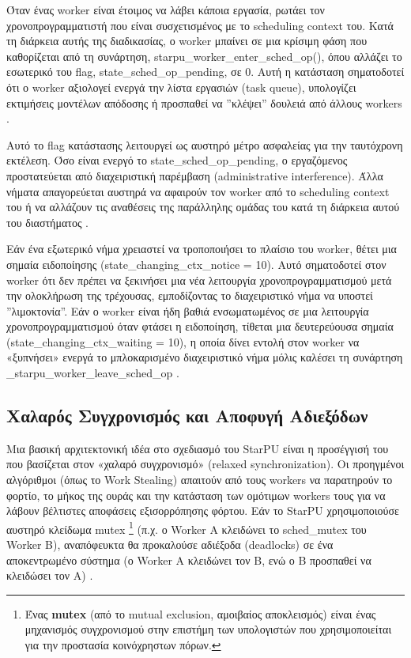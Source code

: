 Όταν ένας worker είναι έτοιμος να λάβει κάποια εργασία, ρωτάει τον χρονοπρογραμματιστή που είναι συσχετισμένος με το scheduling context του. Κατά τη διάρκεια αυτής της διαδικασίας, ο worker μπαίνει σε μια κρίσιμη φάση που καθορίζεται από τη συνάρτηση,  starpu\_worker\_enter\_sched\_op(), όπου αλλάζει το εσωτερικό του flag, state\_sched\_op\_pending, σε 0. Αυτή η κατάσταση σηματοδοτεί ότι ο worker αξιολογεί ενεργά την λίστα εργασιών (task queue), υπολογίζει εκτιμήσεις μοντέλων απόδοσης ή προσπαθεί να ''κλέψει'' δουλειά από άλλους workers \cite{starpu_dev_manual}.

Αυτό το flag κατάστασης λειτουργεί ως αυστηρό μέτρο ασφαλείας για την ταυτόχρονη εκτέλεση. Όσο είναι ενεργό το state\_sched\_op\_pending, ο εργαζόμενος προστατεύεται από διαχειριστική παρέμβαση (administrative interference). Άλλα νήματα απαγορεύεται αυστηρά να αφαιρούν τον worker από το scheduling context του ή να αλλάζουν τις αναθέσεις της παράλληλης ομάδας του κατά τη διάρκεια αυτού του διαστήματος \cite{starpu_dev_manual}.

Εάν ένα εξωτερικό νήμα χρειαστεί να τροποποιήσει το πλαίσιο του worker, θέτει μια σημαία ειδοποίησης (state\_changing\_ctx\_notice = 10). Αυτό σηματοδοτεί στον worker ότι δεν πρέπει να ξεκινήσει μια νέα λειτουργία χρονοπρογραμματισμού μετά την ολοκλήρωση της τρέχουσας, εμποδίζοντας το διαχειριστικό νήμα να υποστεί ''λιμοκτονία''. Εάν ο worker είναι ήδη βαθιά ενσωματωμένος σε μια λειτουργία χρονοπρογραμματισμού όταν φτάσει η ειδοποίηση, τίθεται μια δευτερεύουσα σημαία (state\_changing\_ctx\_waiting = 10), η οποία δίνει εντολή στον worker να «ξυπνήσει» ενεργά το μπλοκαρισμένο διαχειριστικό νήμα μόλις καλέσει τη συνάρτηση \_starpu\_worker\_leave\_sched\_op \cite{starpu_dev_manual}.

\subsection{Χαλαρός Συγχρονισμός και Αποφυγή Αδιεξόδων}

Μια βασική αρχιτεκτονική ιδέα στο σχεδιασμό του StarPU είναι η προσέγγισή του που βασίζεται στον «χαλαρό συγχρονισμό» (relaxed synchronization). Οι προηγμένοι αλγόριθμοι (όπως το Work Stealing) απαιτούν από τους workers να παρατηρούν το φορτίο, το μήκος της ουράς και την κατάσταση των ομότιμων workers τους για να λάβουν βέλτιστες αποφάσεις εξισορρόπησης φόρτου. Εάν το StarPU χρησιμοποιούσε αυστηρό κλείδωμα mutex \footnote{Ένας \textbf{mutex} (από το mutual exclusion, αμοιβαίος αποκλεισμός) είναι ένας μηχανισμός συγχρονισμού στην επιστήμη των υπολογιστών που χρησιμοποιείται για την προστασία κοινόχρηστων πόρων.} (π.χ. ο Worker A κλειδώνει το sched\_mutex του Worker B), αναπόφευκτα θα προκαλούσε αδιέξοδα (deadlocks) σε ένα αποκεντρωμένο σύστημα (ο Worker A κλειδώνει τον B, ενώ ο B προσπαθεί να κλειδώσει τον A) \cite{starpu_dev_manual}.

